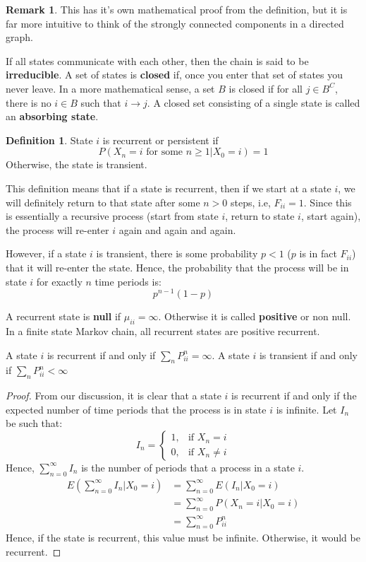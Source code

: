 \documentclass[12pt,letterpaper]{amsbook}
\theoremstyle{definition}
\newtheorem{definition}{Definition}%
\newtheorem*{remark}{Remark}
\begin{document}
\begin{remark}
  This has it's own mathematical proof from the definition, but it is far more intuitive to think of the strongly connected components in a directed graph.  
\end{remark}

If all states communicate with each other, then the chain is said to be \textbf{irreducible}. A set of states is \textbf{closed} if, once you enter that set of states you never leave. In a more mathematical sense, a set $B$ is closed if for all $j \in B^C$, there is no $i \in B$ such that $i \rightarrow j$. A closed set consisting of a single state is called an \textbf{absorbing state}.   

\begin{definition}
  State $i$ is recurrent or persistent if 
  \[P(X_n=i \text{ for some } n \geq 1 | X_0 = i)  = 1\]
  Otherwise, the state is transient.
\end{definition}

This definition means that if a state is recurrent, then if we start at a state $i$, we will definitely return to that state after some $n > 0$ steps, i.e, $F_{ii} = 1$. Since this is essentially a recursive process (start from state $i$, return to state $i$, start again), the process will re-enter $i$ again and again and again. 

However, if a state $i$ is transient, there is some probability $p < 1$ ($p$ is in fact $F_{ii}$) that it will re-enter the state. Hence, the probability that the process will be in state $i$ for exactly $n$ time periods is:
\[p^{n-1} (1-p)\]

A recurrent state is \textbf{null} if $\mu_{ii} = \infty$. Otherwise it is called \textbf{positive} or non null. In a finite state Markov chain, all recurrent states are positive recurrent.

\begin{theorem}
  A state $i$ is recurrent if and only if $\sum_n P_{ii}^n = \infty$. A state $i$ is transient if and only if $\sum_n P_{ii}^n < \infty$  
\end{theorem}
\begin{proof}
  From our discussion, it is clear that a state $i$ is recurrent if and only if the expected number of time periods that the process is in state $i$ is infinite. Let $I_n$ be such that:
  \[I_n = \begin{cases}
    1, & \text{if } X_n = i \\
    0, & \text{if } X_n \neq i
  \end{cases}\]
  Hence, $\sum_{n=0}^{\infty} I_n$ is the number of periods that a process in a state $i$.
  \begin{align*}
    E \left( \sum_{n=0}^{\infty} I_n | X_0 = i\right) &= \sum_{n=0}^{\infty} E(I_n | X_0 = i) \\
                                                      &= \sum_{n=0}^{\infty} P(X_n = i | X_0 = i) \\
                                                      &= \sum_{n=0}^{\infty} P_{ii}^n
  \end{align*}
  Hence, if the state is recurrent, this value must be infinite. Otherwise, it would be recurrent.
\end{proof}
\end{document}
